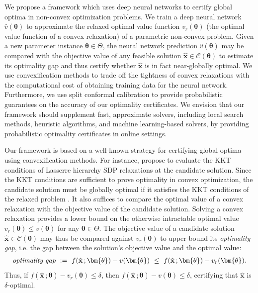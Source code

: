\documentclass[10pt]{article} %
\theoremstyle{plain}
\theoremstyle{definition}
\theoremstyle{remark}
\begin{document}
We propose a framework which uses deep neural networks to certify global optima in non-convex optimization problems. We train a deep neural network $\hat{v}(\bm{\theta})$ to approximate the relaxed optimal value function $v_r(\bm{\theta})$ (the optimal value function of a convex relaxation) of a parametric non-convex problem. Given a new parameter instance $\bm{\theta} \in \Theta$, the neural network prediction $\hat{v}(\bm{\theta})$ may be compared with the objective value of any feasible solution $\hat{\mathbf{x}} \in \mathcal{C}(\bm{\theta})$ to estimate its optimality gap and thus certify whether $\hat{\mathbf{x}}$ is in fact near-globally optimal. 
We use convexification methods to trade off the tightness of convex relaxations with the computational cost of obtaining training data for the neural network. 
Furthermore, we use split conformal calibration to provide probabilistic guarantees on the accuracy of our optimality certificates.
We envision that our framework should supplement fast, approximate solvers, including local search methods, heuristic algorithms, and machine learning-based solvers, by providing probabilistic optimality certificates in online settings.

Our framework is based on a well-known strategy for certifying global optima using convexification methods.
For instance, \citet{xu2021verifying} propose to evaluate the KKT conditions of Lasserre hierarchy SDP relaxations at the candidate solution. Since the KKT conditions are sufficient to prove optimality in convex optimization, the candidate solution must be globally optimal if it satisfies the KKT conditions of the relaxed problem \citep{boyd2004convex}.
It also suffices to compare the optimal value of a convex relaxation with the objective value of the candidate solution.
Solving a convex relaxation provides a lower bound on the otherwise intractable optimal value $v_r(\bm{\theta}) \leq v(\bm{\theta})$ for any $\bm{\theta} \in \Theta$. The objective value of a candidate solution $\hat{\mathbf{x}} \in \mathcal{C}(\bm{\theta})$ may thus be compared against $v_r(\bm{\theta})$ to upper bound its \textit{optimality gap}, i.e. the gap between the solution's objective value and the optimal value:
\begin{align*}
    \text{\textit{optimality gap}} ~:=~ f(\hat{\mathbf{x}}\, ; \bm{\theta}) - v(\bm{\theta}) ~\leq~ f(\hat{\mathbf{x}}\, ; \bm{\theta}) - v_r(\bm{\theta}).
\end{align*}
Thus, if $f(\hat{\mathbf{x}}\,;\bm{\theta}) - v_r(\bm{\theta}) \leq \delta$, then $f(\hat{\mathbf{x}}\,;\bm{\theta}) - v(\bm{\theta}) \leq \delta$, certifying that $\hat{\mathbf{x}}$ is $\delta$-optimal.
\end{document}
